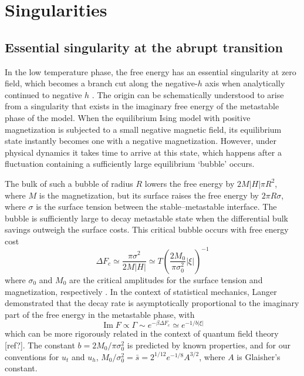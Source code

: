 \documentclass[
aps,
pre,
preprint,
longbibliography,
floatfix
]{revtex4-2}
\begin{document}
\section{Singularities}

\subsection{Essential singularity at the abrupt transition}

In the low temperature phase, the free energy has an essential singularity at
zero field, which becomes a branch cut along the negative-$h$ axis when
analytically continued to negative $h$ \cite{Langer_1967_Theory}. The origin
can be schematically understood to arise from a singularity that exists in the
imaginary free energy of the metastable phase of the model. When the
equilibrium Ising model with positive magnetization is subjected to a small
negative magnetic field, its equilibrium state instantly becomes one with a
negative magnetization. However, under physical dynamics it takes time to
arrive at this state, which happens after a fluctuation containing a
sufficiently large equilibrium `bubble' occurs.

The bulk of such a bubble of radius $R$ lowers the free energy by $2M|H|\pi
R^2$, where  $M$ is the magnetization, but its surface raises the free energy
by $2\pi R\sigma$, where $\sigma$ is the surface tension between the
stable--metastable interface. The bubble is sufficiently large to decay
metastable state when the differential bulk savings outweigh the surface costs.
This critical bubble occurs with free energy cost
\begin{equation}
  \Delta F_c
    \simeq\frac{\pi\sigma^2}{2M|H|}
    \simeq T\left(\frac{2M_0}{\pi\sigma_0^2}|\xi|\right)^{-1}
\end{equation}
where $\sigma_0$ and $M_0$ are the critical amplitudes for the surface tension
and magnetization, respectively \cite{Kent-Dobias_2020_Novel}.  In the context
of statistical mechanics, Langer demonstrated that the decay rate is
asymptotically proportional to the imaginary part of the free energy in the
metastable phase, with
\begin{equation}
  \operatorname{Im}F\propto\Gamma\sim e^{-\beta\Delta F_c}\simeq e^{-1/b|\xi|}
\end{equation}
which can be more rigorously related in the context of quantum field theory
[ref?]. The constant $b=2M_0/\pi\sigma_0^2$ is predicted by known properties,
and for our conventions for $u_t$ and $u_h$, $M_0/\sigma_0^2=\bar
s=2^{1/12}e^{-1/8}A^{3/2}$, where $A$ is Glaisher's constant.
\end{document}
